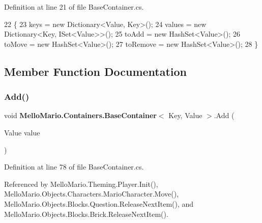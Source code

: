 Definition at line 21 of file Base\+Container.\+cs.


\begin{DoxyCode}
22         \{
23             keys = \textcolor{keyword}{new} Dictionary<Value, Key>();
24             values = \textcolor{keyword}{new} Dictionary<Key, ISet<Value>>();
25             toAdd = \textcolor{keyword}{new} HashSet<Value>();
26             toMove = \textcolor{keyword}{new} HashSet<Value>();
27             toRemove = \textcolor{keyword}{new} HashSet<Value>();
28         \}
\end{DoxyCode}


\subsection{Member Function Documentation}
\mbox{\label{classMelloMario_1_1Containers_1_1BaseContainer_a09791801b12923f7b6b7e83decfbe997}} 
\subsubsection{Add()}
{\footnotesize\ttfamily void \textbf{ Mello\+Mario.\+Containers.\+Base\+Container}$<$ Key, Value $>$.Add (\begin{DoxyParamCaption}\item[{Value}]{value }\end{DoxyParamCaption})}



Definition at line 78 of file Base\+Container.\+cs.



Referenced by Mello\+Mario.\+Theming.\+Player.\+Init(), Mello\+Mario.\+Objects.\+Characters.\+Mario\+Character.\+Move(), Mello\+Mario.\+Objects.\+Blocks.\+Question.\+Release\+Next\+Item(), and Mello\+Mario.\+Objects.\+Blocks.\+Brick.\+Release\+Next\+Item().


